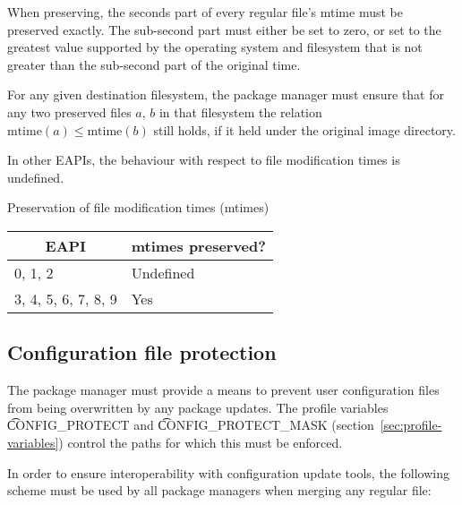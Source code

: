 When preserving, the seconds part of every regular file's mtime must
be preserved exactly. The sub-second part must either be set to zero,
or set to the greatest value supported by the operating system and
filesystem that is not greater than the sub-second part of the
original time.

For any given destination filesystem, the package manager must ensure
that for any two preserved files $a$, $b$ in that filesystem the
relation $\mbox{mtime}(a) \leq \mbox{mtime}(b)$ still holds, if it
held under the original image directory.

In other EAPIs, the behaviour with respect to file modification times
is undefined.

\begin{centertable}{Preservation of file modification times (mtimes)}
    \label{tab:mtime-preserve}
    \begin{tabular}{ll}
      \toprule
      \multicolumn{1}{c}{\textbf{EAPI}} &
      \multicolumn{1}{c}{\textbf{mtimes preserved?}} \\
      \midrule
      0, 1, 2             & Undefined \\
      3, 4, 5, 6, 7, 8, 9 & Yes       \\
      \bottomrule
    \end{tabular}
\end{centertable}

\subsection{Configuration file protection}
\label{sec:config-protect}

The package manager must provide a means to prevent user configuration files from being
overwritten by any package updates. The profile variables \t{CONFIG_PROTECT} and
\t{CONFIG_PROTECT_MASK} (section~\ref{sec:profile-variables}) control the paths for which this
must be enforced.

In order to ensure interoperability with configuration update tools, the following scheme must be
used by all package managers when merging any regular file:

